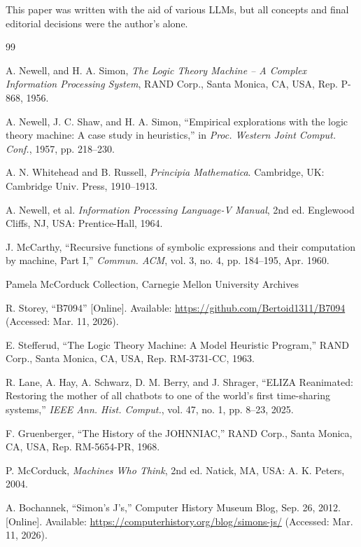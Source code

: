 \documentclass[journal]{IEEEtran}
\begin{document}
{\footnotesize This paper was written with the aid of various LLMs, but all concepts
and final editorial decisions were the author's alone.}

\begin{thebibliography}{99}

 A. Newell, and H. A. Simon, \textit{The Logic Theory
  Machine -- A Complex Information Processing System}, RAND Corp.,
  Santa Monica, CA, USA, Rep. P-868, 1956.

 A. Newell, J. C. Shaw, and H. A. Simon, ``Empirical
  explorations with the logic theory machine: A case study in
  heuristics,'' in \textit{Proc. Western Joint Comput. Conf.}, 1957,
  pp. 218--230.

 A. N. Whitehead and B. Russell,
  \textit{Principia Mathematica}. Cambridge, UK: Cambridge
  Univ. Press, 1910--1913.

 A. Newell, et al. \textit{Information
  Processing Language-V Manual}, 2nd ed. Englewood Cliffs, NJ, USA:
  Prentice-Hall, 1964.

 J. McCarthy, ``Recursive functions of
  symbolic expressions and their computation by machine, Part I,''
  \textit{Commun. ACM}, vol. 3, no. 4, pp. 184--195, Apr. 1960.

  Pamela McCorduck Collection, Carnegie Mellon University Archives

 R. Storey, ``B7094'' [Online]. Available:
  \url{https://github.com/Bertoid1311/B7094} (Accessed: Mar. 11,
  2026).

 E. Stefferud, ``The Logic Theory Machine: A
  Model Heuristic Program,'' RAND Corp., Santa Monica, CA, USA,
  Rep. RM-3731-CC, 1963.

 R. Lane, A. Hay, A. Schwarz, D. M. Berry, and
  J. Shrager, ``ELIZA Reanimated: Restoring the mother of all chatbots
  to one of the world's first time-sharing systems,'' \textit{IEEE
    Ann. Hist. Comput.}, vol. 47, no. 1, pp. 8--23, 2025.

 F. Gruenberger, ``The History of the
  JOHNNIAC,'' RAND Corp., Santa Monica, CA, USA, Rep. RM-5654-PR,
  1968.

 P. McCorduck, \textit{Machines Who
  Think}, 2nd ed. Natick, MA, USA: A. K. Peters, 2004.

 A. Bochannek, ``Simon’s J’s,''
  Computer History Museum Blog, Sep. 26, 2012. [Online]. Available:
  \url{https://computerhistory.org/blog/simons-js/} (Accessed:
  Mar. 11, 2026).


\end{thebibliography}
\end{document}
